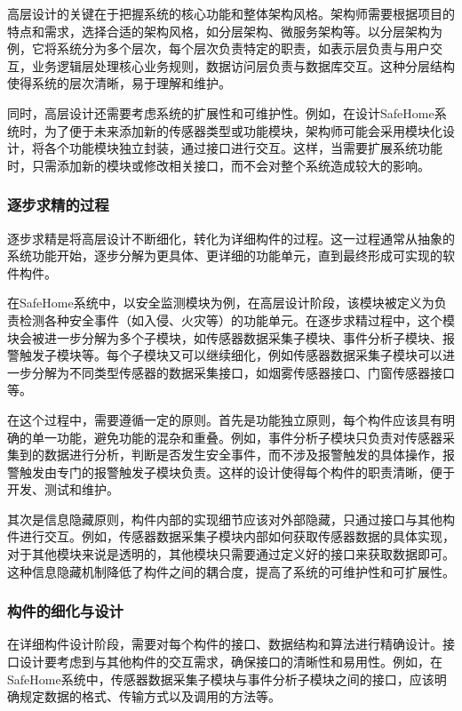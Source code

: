 高层设计的关键在于把握系统的核心功能和整体架构风格。架构师需要根据项目的特点和需求，选择合适的架构风格，如分层架构、微服务架构等。以分层架构为例，它将系统分为多个层次，每个层次负责特定的职责，如表示层负责与用户交互，业务逻辑层处理核心业务规则，数据访问层负责与数据库交互。这种分层结构使得系统的层次清晰，易于理解和维护。

同时，高层设计还需要考虑系统的扩展性和可维护性。例如，在设计SafeHome系统时，为了便于未来添加新的传感器类型或功能模块，架构师可能会采用模块化设计，将各个功能模块独立封装，通过接口进行交互。这样，当需要扩展系统功能时，只需添加新的模块或修改相关接口，而不会对整个系统造成较大的影响。

\subsubsection{逐步求精的过程}

逐步求精是将高层设计不断细化，转化为详细构件的过程。这一过程通常从抽象的系统功能开始，逐步分解为更具体、更详细的功能单元，直到最终形成可实现的软件构件。

在SafeHome系统中，以安全监测模块为例，在高层设计阶段，该模块被定义为负责检测各种安全事件（如入侵、火灾等）的功能单元。在逐步求精过程中，这个模块会被进一步分解为多个子模块，如传感器数据采集子模块、事件分析子模块、报警触发子模块等。每个子模块又可以继续细化，例如传感器数据采集子模块可以进一步分解为不同类型传感器的数据采集接口，如烟雾传感器接口、门窗传感器接口等。

在这个过程中，需要遵循一定的原则。首先是功能独立原则，每个构件应该具有明确的单一功能，避免功能的混杂和重叠。例如，事件分析子模块只负责对传感器采集到的数据进行分析，判断是否发生安全事件，而不涉及报警触发的具体操作，报警触发由专门的报警触发子模块负责。这样的设计使得每个构件的职责清晰，便于开发、测试和维护。

其次是信息隐藏原则，构件内部的实现细节应该对外部隐藏，只通过接口与其他构件进行交互。例如，传感器数据采集子模块内部如何获取传感器数据的具体实现，对于其他模块来说是透明的，其他模块只需要通过定义好的接口来获取数据即可。这种信息隐藏机制降低了构件之间的耦合度，提高了系统的可维护性和可扩展性。

\subsubsection{构件的细化与设计}

在详细构件设计阶段，需要对每个构件的接口、数据结构和算法进行精确设计。接口设计要考虑到与其他构件的交互需求，确保接口的清晰性和易用性。例如，在SafeHome系统中，传感器数据采集子模块与事件分析子模块之间的接口，应该明确规定数据的格式、传输方式以及调用的方法等。

